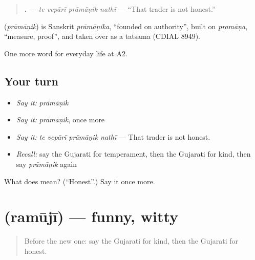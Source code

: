\begin{quote}
\textbf{   .} — \emph{te vepārī prāmāṇik nathī} — \textquotedblleft{}That trader is not honest.\textquotedblright{}
\end{quote}

\begin{cousinweb}
\textbf{} (\emph{prāmāṇik}) is Sanskrit \emph{prāmāṇika}, \textquotedblleft{}founded on authority\textquotedblright{}, built on \emph{pramāṇa}, \textquotedblleft{}measure, proof\textquotedblright{}, and taken over as a tatsama (CDIAL 8949).
\end{cousinweb}

\begin{grammarlens}[title={What you've built}]
One more word for everyday life at A2.
\end{grammarlens}

\subsection*{Your turn}
\begin{itemize}
\raggedright
  \item \emph{Say it:} \emph{prāmāṇik}
  \item \emph{Say it:} \emph{prāmāṇik}, once more
  \item \emph{Say it:} \emph{te vepārī prāmāṇik nathī} — That trader is not honest.
  \item \emph{Recall:} say the Gujarati for temperament, then the Gujarati for kind, then say \emph{prāmāṇik} again
\end{itemize}

\begin{tcolorbox}[breakable,colback=teal!4,colframe=teal!35!black,title={Before you move on}]
What does  mean? (\textquotedblleft{}Honest\textquotedblright{}.) Say it once more.
\end{tcolorbox}
\section[\texorpdfstring{\gu{રમૂજી} (ramūjī)}{રમૂજી (ramūjī)}]{ (ramūjī) — funny, witty}

\label{lesson:GU-C270-ramuji}



\begin{quote}
Before the new one: say the Gujarati for kind, then the Gujarati for honest.
\end{quote}

